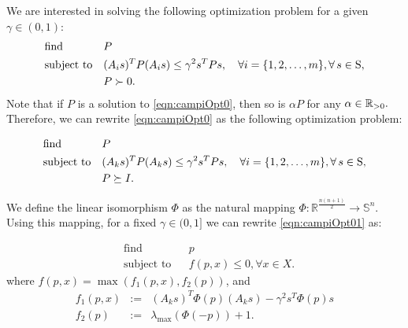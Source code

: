 We are interested in solving the following optimization problem for a given $\gamma \in (0,1)$:
\begin{equation}
\label{eqn:campiOpt0}
\begin{aligned}
& \text{find} & & P \\
& \text{subject to} 
&  & (A_is)^TP(A_is) \leq \gamma^2 s^TPs, \quad \forall i = \{1,2, \ldots, m\},  \forall\, s \in \text{S},\\
& && P \succ 0. \\
\end{aligned}
\end{equation}
Note that if $P$ is a solution to \eqref{eqn:campiOpt0}, then so is $\alpha P$ for any $\alpha \in \mathbb{R}_{> 0}.$Therefore, we can rewrite \eqref{eqn:campiOpt0} as the following optimization problem:

\begin{equation}
\label{eqn:campiOpt01}
\begin{aligned}
& \text{find} & & P \\
& \text{subject to} 
&  & (A_ks)^TP(A_ks) \leq \gamma^2 s^TPs, \quad \forall i = \{1,2, \ldots, m\},  \forall\, s \in \text{S},\\
& & & P \succeq I.
\end{aligned}
\end{equation}

We define the linear isomorphism $\Phi$ as the natural mapping \mbox{$\Phi: \mathbb{R}^{\frac{n(n+1)}{2}} \to \mathbb{S}^n$.} Using this mapping, for a fixed $\gamma \in (0, 1]$ we can rewrite \eqref{eqn:campiOpt01} as:

\begin{equation}
\label{eqn:campiOpt1}
\begin{aligned}
& \text{find} & & p \\
& \text{subject to} 
& & f(p,x) \leq 0, \forall x \in X.
\end{aligned}
\end{equation}
where $f(p,x) = \max(f_1(p, x), f_2(p))$, and 
\begin{eqnarray*}
f_1(p,x) &:=& (A_ks)^T\Phi(p)(A_ks) - \gamma^2 s^T\Phi(p)s \\
f_2(p) &:=& \lambda_{\max}(\Phi(-p)) +1.
\end{eqnarray*}


